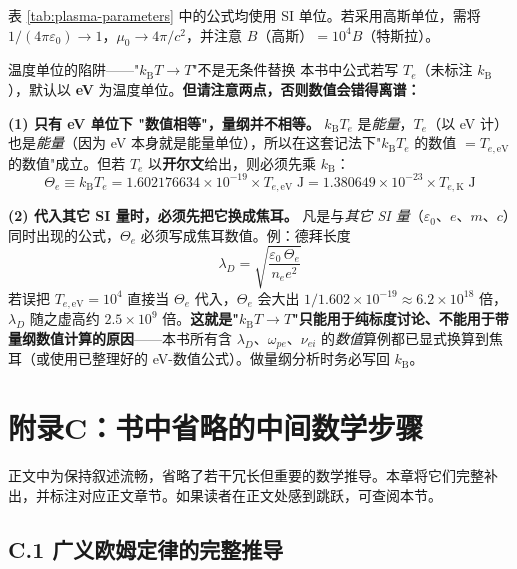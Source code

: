\documentclass[12pt,a4paper,openany,oneside]{book}
\newcommand{\eps}{\varepsilon}
\begin{document}
\begin{insight}{}{}
表 \ref{tab:plasma-parameters} 中的公式均使用 SI 单位。若采用高斯单位，需将 $1/(4\pi\eps_0)\to 1$，$\mu_0\to 4\pi/c^2$，并注意 $B$（高斯）$=10^4 B$（特斯拉）。
\end{insight}

\begin{warning}{温度单位的陷阱——"$k_\mathrm{B}T\to T$"不是无条件替换}{}
本书中公式若写 $T_e$（未标注 $k_\mathrm{B}$），默认以 \textbf{eV} 为温度单位。\textbf{但请注意两点，否则数值会错得离谱：}

\textbf{(1) 只有 eV 单位下 "数值相等"，量纲并不相等。} $k_\mathrm{B}T_e$ 是\emph{能量}，$T_e$（以 eV 计）也是\emph{能量}（因为 eV 本身就是能量单位），所以在这套记法下"$k_\mathrm{B}T_e$ 的数值 $=T_{e,\mathrm{eV}}$ 的数值"成立。但若 $T_e$ 以\textbf{开尔文}给出，则必须先乘 $k_\mathrm{B}$：
\[
\Theta_e \equiv k_\mathrm{B}T_e = 1.602176634\times 10^{-19}\times T_{e,\mathrm{eV}}\;\mathrm{J}
= 1.380649\times 10^{-23}\times T_{e,\mathrm{K}}\;\mathrm{J}
\]

\textbf{(2) 代入其它 SI 量时，必须先把它换成焦耳。} 凡是与\emph{其它 SI 量}（$\eps_0$、$e$、$m$、$c$）同时出现的公式，$\Theta_e$ 必须写成焦耳数值。例：德拜长度
\[
\lambda_D = \sqrt{\frac{\eps_0\,\Theta_e}{n_ee^2}}
\]
若误把 $T_{e,\mathrm{eV}}=10^4$ 直接当 $\Theta_e$ 代入，$\Theta_e$ 会大出 $1/1.602\times10^{-19}\approx6.2\times10^{18}$ 倍，$\lambda_D$ 随之虚高约 $2.5\times10^{9}$ 倍。\textbf{这就是"$k_\mathrm{B}T\to T$"只能用于纯标度讨论、不能用于带量纲数值计算的原因}——本书所有含 $\lambda_D$、$\omega_{pe}$、$\nu_{ei}$ 的\emph{数值}算例都已显式换算到焦耳（或使用已整理好的 eV-数值公式）。做量纲分析时务必写回 $k_\mathrm{B}$。
\end{warning}


\chapter*{附录C：书中省略的中间数学步骤}

正文中为保持叙述流畅，省略了若干冗长但重要的数学推导。本章将它们完整补出，并标注对应正文章节。如果读者在正文处感到跳跃，可查阅本节。


\section{C.1 广义欧姆定律的完整推导}
\label{sec:gen-ohm}
\end{document}
